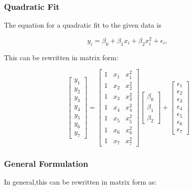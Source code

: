 \subsubsection{Quadratic Fit}

The equation for a quadratic fit to the given data is

\begin{equation}
  y_i = \beta_0 + \beta_1 x_i + \beta_2 x_i^2 +\epsilon_i, \,
\end{equation}

This can be rewritten in matrix form:

\begin{equation}\label{eq:polynomialRegression}
  \begin{bmatrix}y_1 \\ y_2 \\ y_3 \\ y_4 \\ y_5 \\ y_6 \\ y_7 \end{bmatrix}
  =
  \begin{bmatrix}1 & x_1 & x_1^2 \\1 & x_2  & x_2^2 \\1 & x_3  & x_3^2 \\1 & x_4  & x_4^2 \\1 & x_5  & x_5^2 \\1 & x_6  & x_6^2 \\ 1 & x_7  & x_7^2 \end{bmatrix}
  \begin{bmatrix} \beta_0 \\ \beta_1  \\ \beta_2 \end{bmatrix}
  +
  \begin{bmatrix} \epsilon_1 \\ \epsilon_2 \\ \epsilon_3 \\ \epsilon_4 \\ \epsilon_5 \\ \epsilon_6 \\ \epsilon_7 \end{bmatrix}
\end{equation}

\subsubsection{General Formulation}

In general,this can be rewritten in matrix form as:

